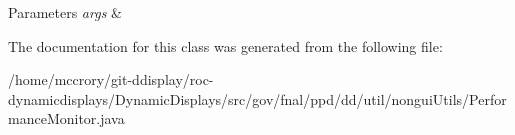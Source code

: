 \begin{DoxyParams}{Parameters}
{\em args} & \\
\hline
\end{DoxyParams}


The documentation for this class was generated from the following file\-:\begin{DoxyCompactItemize}
\item 
/home/mccrory/git-\/ddisplay/roc-\/dynamicdisplays/\-Dynamic\-Displays/src/gov/fnal/ppd/dd/util/nongui\-Utils/Performance\-Monitor.\-java\end{DoxyCompactItemize}
